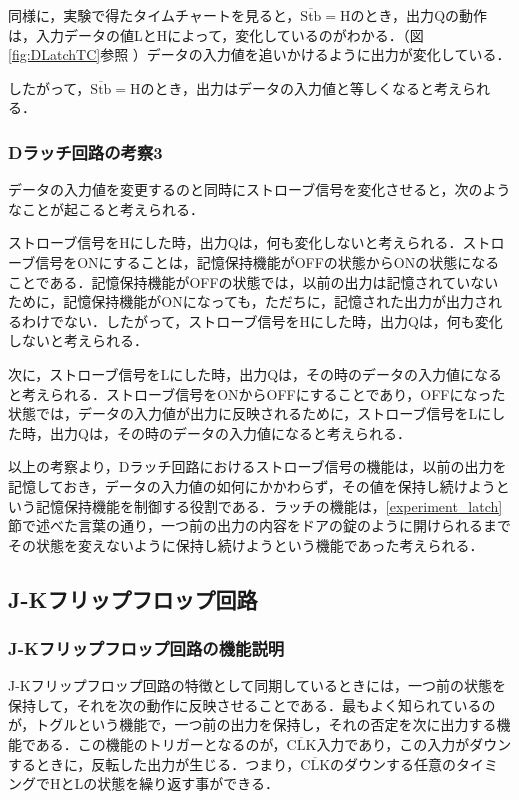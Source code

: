同様に，実験で得たタイムチャートを見ると，$\overline{\mathrm{Stb}}=\mathrm{H}$のとき，出力$\mathrm{Q}$の動作は，入力データの値LとHによって，変化しているのがわかる．（図\ref{fig:DLatchTC}参照 ）データの入力値を追いかけるように出力が変化している．

したがって，$\overline{\mathrm{Stb}}=\mathrm{H}$のとき，出力はデータの入力値と等しくなると考えられる．


%
%
\subsubsection{Dラッチ回路の考察3}
\label{DLatch_consideration3}
データの入力値を変更するのと同時にストローブ信号を変化させると，次のようなことが起こると考えられる．

ストローブ信号をHにした時，出力Qは，何も変化しないと考えられる．ストローブ信号をONにすることは，記憶保持機能がOFFの状態からONの状態になることである．記憶保持機能がOFFの状態では，以前の出力は記憶されていないために，記憶保持機能がONになっても，ただちに，記憶された出力が出力されるわけでない．したがって，ストローブ信号をHにした時，出力Qは，何も変化しないと考えられる．

次に，ストローブ信号をLにした時，出力Qは，その時のデータの入力値になると考えられる．ストローブ信号をONからOFFにすることであり，OFFになった状態では，データの入力値が出力に反映されるために，ストローブ信号をLにした時，出力Qは，その時のデータの入力値になると考えられる．
\\
\par
以上の考察より，Dラッチ回路におけるストローブ信号の機能は，以前の出力を記憶しておき，データの入力値の如何にかかわらず，その値を保持し続けようという記憶保持機能を制御する役割である．ラッチの機能は，\ref{experiment_latch}節で述べた言葉の通り，一つ前の出力の内容をドアの錠のように開けられるまでその状態を変えないように保持し続けようという機能であった考えられる．

%
%
\subsection{J-Kフリップフロップ回路}
\label{experiment_JKflipflop}

%
%
\subsubsection{J-Kフリップフロップ回路の機能説明}
\label{JKFF_explain}
J-Kフリップフロップ回路の特徴として同期しているときには，一つ前の状態を保持して，それを次の動作に反映させることである．最もよく知られているのが，トグルという機能で，一つ前の出力を保持し，それの否定を次に出力する機能である．この機能のトリガーとなるのが，$\overline{\mathrm{CLK}}$入力であり，この入力がダウンするときに，反転した出力が生じる．つまり，$\overline{\mathrm{CLK}}$のダウンする任意のタイミングでHとLの状態を繰り返す事ができる．

